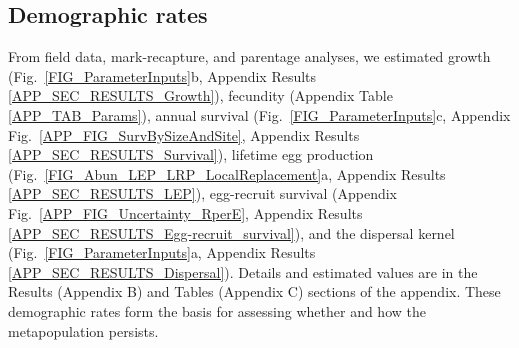 \documentclass[12pt, oneside]{article}   	%
\begin{document}

\subsection*{Demographic rates}


From field data, mark-recapture, and parentage analyses, we estimated growth (Fig.\ \ref{FIG_ParameterInputs}b, Appendix Results \ref{APP_SEC_RESULTS_Growth}), fecundity (Appendix Table \ref{APP_TAB_Params}), annual survival (Fig.\ \ref{FIG_ParameterInputs}c, Appendix Fig.\ \ref{APP_FIG_SurvBySizeAndSite}, Appendix Results \ref{APP_SEC_RESULTS_Survival}), lifetime egg production (Fig.\ \ref{FIG_Abun_LEP_LRP_LocalReplacement}a, Appendix Results \ref{APP_SEC_RESULTS_LEP}), egg-recruit survival (Appendix Fig.\ \ref{APP_FIG_Uncertainty_RperE}, Appendix Results \ref{APP_SEC_RESULTS_Egg-recruit_survival}), and the dispersal kernel (Fig.\ \ref{FIG_ParameterInputs}a, Appendix Results \ref{APP_SEC_RESULTS_Dispersal}). Details and estimated values are in the Results (Appendix B) and Tables (Appendix C) sections of the appendix. These demographic rates form the basis for assessing whether and how the metapopulation persists.
\end{document}
